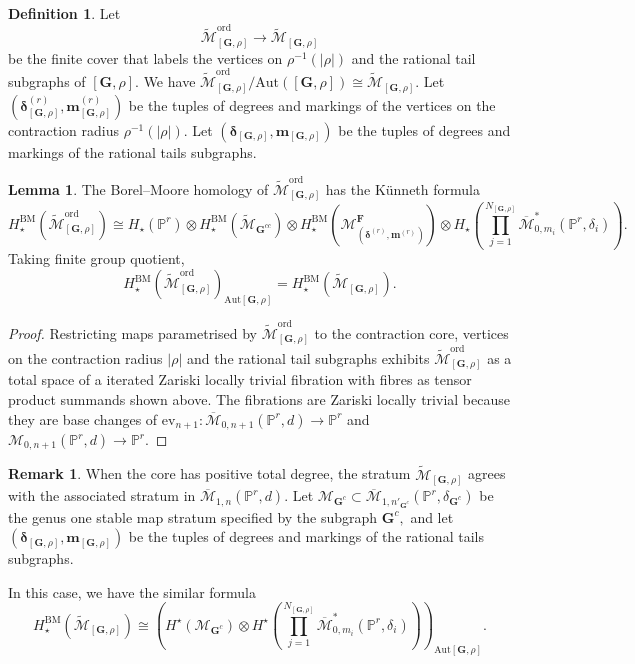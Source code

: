 \documentclass[12pt,reqno]{amsart}
\theoremstyle{definition}
\theoremstyle{definition}
\theoremstyle{definition}
\theoremstyle{definition}
\newtheorem{lemma}[theorem]{Lemma}
\newtheorem{remark}[theorem]{Remark}
\newtheorem{definition}[theorem]{Definition}
\newcommand{\ol}[1]{\overline{#1}}
\newcommand{\PP}{\mathbb{P}}
\newcommand{\Mcal}{\mathcal{M}}
\newcommand{\Mbar}{\ol{\Mcal}}
\newcommand{\M}{\mathcal{M}}
\newcommand{\Mtil}{\widetilde{\mathcal{M}}}
\begin{document}
  \begin{definition}Let $$\Mtil^{\mathrm{ord}}_{[\mathbf{G}, \rho]}\to \Mtil_{[\mathbf{G}, \rho]}$$ be the finite cover that labels the vertices on $\rho^{-1}(|\rho|)$ and the rational tail subgraphs of $[\mathbf{G}, \rho].$ We have $\Mtil^{\mathrm{ord}}_{[\mathbf{G}, \rho]}/\mathrm{Aut}([\mathbf{G}, \rho])\cong \Mtil_{[\mathbf{G}, \rho]}.$ Let $(\boldsymbol{\delta}^{(r)}_{[\mathbf{G}, \rho]},\boldsymbol{m}^{(r)}_{[\mathbf{G}, \rho]})$ be the tuples of degrees and markings of the vertices on the contraction radius $\rho^{-1}(|\rho|).$ Let $(\boldsymbol{\delta}_{[\mathbf{G}, \rho]}, \boldsymbol{m}_{[\mathbf{G}, \rho]})$ be the tuples of degrees and markings of the rational tails subgraphs.
  \end{definition}

  \begin{lemma}\label{lem:kunneth}
    The Borel--Moore homology of $\Mtil^{\mathrm{ord}}_{[\mathbf{G}, \rho]}$ has the Künneth formula $$H_\star^{\mathrm{BM}}(\Mtil^{\mathrm{ord}}_{[\mathbf{G}, \rho]})\cong H_\star(\mathbb{P}^r)\otimes H_\star^{\mathrm{BM}}(\Mtil_{\mathbf{G}^{cc}})\otimes H_\star^{\mathrm{BM}}(\mathcal{M}^{\mathbf{F}}_{(\boldsymbol{\delta}^{(r)}, \boldsymbol{m}^{(r)})})\otimes H_\star\left(\prod_{j=1}^{N_{[\mathbf{G}, \rho]}}\Mbar_{0,m_i}^* (\mathbb{P}^r,\delta_i)\right).$$ Taking finite group quotient, $$H_\star^{\mathrm{BM}}(\Mtil^{\mathrm{ord}}_{[\mathbf{G}, \rho]})_{\mathrm{Aut}[\mathbf{G},\rho]} = H_\star^{\mathrm{BM}}(\Mtil_{[\mathbf{G}, \rho]}).$$
  \end{lemma}
  \begin{proof}
    Restricting maps parametrised by $\Mtil^{\mathrm{ord}}_{[\mathbf{G}, \rho]}$ to the contraction core, vertices on the contraction radius $|\rho|$ and the rational tail subgraphs exhibits $\Mtil^{\mathrm{ord}}_{[\mathbf{G}, \rho]}$ as a total space of a iterated Zariski locally trivial fibration with fibres as tensor product summands shown above. The fibrations are Zariski locally trivial because they are base changes of $\mathrm{ev}_{n+1}: \Mbar_{0,n+1}(\PP^r,d)\to \PP^r$ and $\M_{0,n+1}(\PP^r,d)\to \PP^r.$
  \end{proof}

\begin{remark}
  When the core has positive total degree, the stratum $\Mtil_{[\mathbf{G},\rho]}$ agrees with the associated stratum in $\Mbar_{1,n}(\PP^r,d).$ Let $\mathcal{M}_{\mathbf{G}^{c}}\subset \Mbar_{1,n'_{\mathbf{G}^{c}}}(\mathbb{P}^r,\delta_{\mathbf{G}^{c}})$ be the genus one stable map stratum specified by the subgraph $\mathbf{G}^c,$ and let $(\boldsymbol{\delta}_{[\mathbf{G}, \rho]}, \boldsymbol{m}_{[\mathbf{G}, \rho]})$ be the tuples of degrees and markings of the rational tails subgraphs.
  
  In this case, we have the similar formula $$H_\star^{\mathrm{BM}}(\Mtil_{[\mathbf{G},\rho]})\cong \left(H^\star(\mathcal{M}_{\mathbf{G}^{c}})\otimes H^\star(\prod_{j=1}^{N_{[\mathbf{G},\rho]}}\Mbar_{0,m_i}^* (\mathbb{P}^r,\delta_i))\right)_{\mathrm{Aut}[\mathbf{G},\rho]}.$$
\end{remark}
\end{document}
